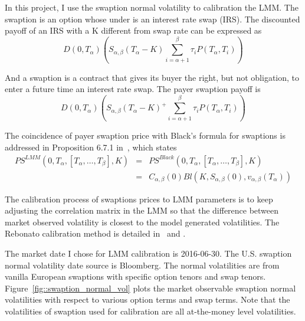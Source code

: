 In this project, I use the swaption normal volatility to calibration the LMM. The swaption is an option whose under is an interest rate swap (IRS). The discounted payoff of an IRS with a K different from swap rate can be expressed as
$$
D(0,T_{\alpha})(S_{\alpha,\beta}(T_{\alpha}-K)\sum_{i=\alpha+1}^{\beta} \tau_i P(T_{\alpha}, T_i))
$$

And a swaption is a contract that gives its buyer the right, but not obligation, to enter a future time an interest rate swap. The payer swaption payoff is
$$
D(0,T_{\alpha})(S_{\alpha,\beta}(T_{\alpha}-K)^+\sum_{i=\alpha+1}^{\beta} \tau_i P(T_{\alpha}, T_i))
$$

The coincidence of payer swaption price with Black's formula for swaptions is addressed in Proposition 6.7.1 in~\cite{bm06}, which states
\begin{eqnarray*}
PS^{LMM}(0,T_{\alpha},[T_{\alpha},\ldots,T_{\beta}],K) &=& PS^{Black}(0,T_{\alpha},[T_{\alpha},\ldots,T_{\beta}],K) \\
            &=& C_{\alpha,\beta}(0)Bl(K,S_{\alpha,\beta}(0),v_{\alpha,\beta}(T_\alpha))
\end{eqnarray*}

The calibration process of swaptions prices to LMM parameters is to keep adjusting the correlation matrix in the LMM so that the difference between market observed volatility is closest to the model generated volatilities. The Rebonato calibration method is detailed in~\cite{re99} and \cite{re02}.

The market date I chose for LMM calibration is 2016-06-30. The U.S. swaption normal volatility date source is Bloomberg. The normal volatilities are from vanilla European swaptions with specific option tenors and swap tenors. Figure~\ref{fig::swaption_normal_vol} plots the market observable swaption normal volatilities with respect to various option terms and swap terms. Note that the volatilities of swaption used for calibration are all at-the-money level volatilities.

